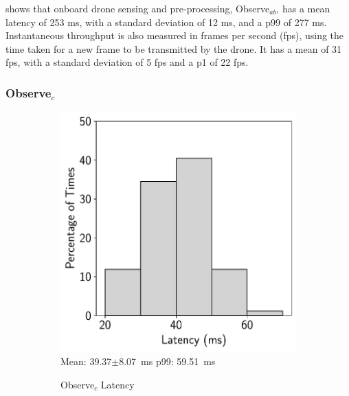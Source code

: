  shows that onboard drone sensing and
pre-processing, Observe$_{ab}$, has a mean latency of 253 ms, with a standard
deviation of 12 ms, and a p99 of 277 ms. Instantaneous throughput is also
measured in frames per second (fps), using the time taken for a new frame to be
transmitted by the drone. It has a mean of 31 fps, with a standard deviation of
5 fps and a p1 of 22 fps.

\subsubsection{\texorpdfstring{Observe$_c$}{Observe\_c}}

\begin{figure}[htbp]
    \centering
    \begin{subfigure}[t]{0.45\textwidth}
    \centering
    \includegraphics[width = .8\textwidth]{figs/observe-c-latency.pdf}\\
    \small{Mean: 39.37$\pm$8.07~ms\; p99: 59.51~ms}\\
    \caption{Observe$_{c}$ Latency}
    \label{fig:observe_c_latency}
\end{subfigure}
\begin{subfigure}[t]{0.45\textwidth}

\end{subfigure}
\end{figure}

